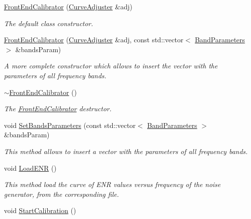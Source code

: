 \begin{DoxyCompactItemize}
\item 
\hyperlink{classFrontEndCalibrator_abff839c00a46ff060c1d66fc3b151d65}{Front\+End\+Calibrator} (\hyperlink{classCurveAdjuster}{Curve\+Adjuster} \&adj)
\begin{DoxyCompactList}\small\item\em The default class constructor. \end{DoxyCompactList}\item 
\hyperlink{classFrontEndCalibrator_a026150fceb18ec9601cbc698e04f39cc}{Front\+End\+Calibrator} (\hyperlink{classCurveAdjuster}{Curve\+Adjuster} \&adj, const std\+::vector$<$ \hyperlink{structBandParameters}{Band\+Parameters} $>$ \&bands\+Param)
\begin{DoxyCompactList}\small\item\em A more complete constructor which allows to insert the vector with the parameters of all frequency bands. \end{DoxyCompactList}\item 
\hyperlink{classFrontEndCalibrator_a8744dd099d7e7ba6f04be3505cd4a607}{$\sim$\+Front\+End\+Calibrator} ()
\begin{DoxyCompactList}\small\item\em The {\itshape \hyperlink{classFrontEndCalibrator}{Front\+End\+Calibrator}} destructor. \end{DoxyCompactList}\item 
void \hyperlink{classFrontEndCalibrator_a6fcf8e8343878614d1b03910bb97a3d6}{Set\+Bands\+Parameters} (const std\+::vector$<$ \hyperlink{structBandParameters}{Band\+Parameters} $>$ \&bands\+Param)
\begin{DoxyCompactList}\small\item\em This method allows to insert a vector with the parameters of all frequency bands. \end{DoxyCompactList}\item 
void \hyperlink{classFrontEndCalibrator_af166e90f4fe0dfd7cdf825b88d33a479}{Load\+E\+NR} ()
\begin{DoxyCompactList}\small\item\em This method load the curve of E\+NR values versus frequency of the noise generator, from the corresponding file. \end{DoxyCompactList}\item 
\mbox{\label{classFrontEndCalibrator_a548817f0476ac8a459a991a0518e9be5}} 
void \hyperlink{classFrontEndCalibrator_a548817f0476ac8a459a991a0518e9be5}{Start\+Calibration} ()

\end{DoxyCompactItemize}
